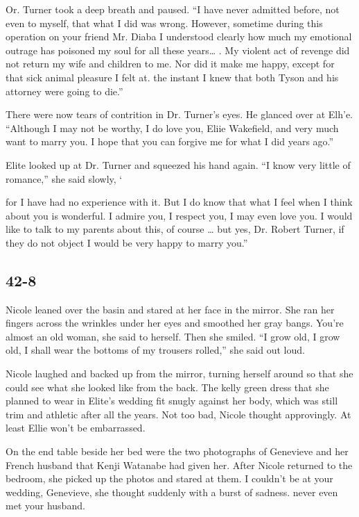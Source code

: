 \documentclass[]{article}
\begin{document}
{Or.  Turner took a deep breath and paused.  “I have never admitted before, not even to myself, that what I did was wrong.  However, sometime during this operation on your friend Mr.  Diaba I understood clearly how much my emotional outrage has poisoned my soul for all these years… .  My violent act of revenge did not return my wife and children to me.  Nor did it make me happy, except for that sick animal pleasure I felt at.  the instant I knew that both Tyson and his attorney were going to die.”

There were now tears of contrition in Dr.  Turner’s eyes.  He glanced over at Elh’e.  “Although I may not be worthy, I do love you, Eliie Wakefield, and very much want to marry you.  I hope that you can forgive me for what I did years ago.”

Elite looked up at Dr.  Turner and squeezed his hand again.  “I know very little of romance,” she said slowly, ‘

for I have had no experience with it.  But I do know that what I feel when I think about you is wonderful.  I admire you, I respect you, I may even love you.  I would like to talk to my parents about this, of course … but yes, Dr.  Robert Turner, if they do not object I would be very happy to marry you.”


\subsection*{42-8}

Nicole leaned over the basin and stared at her face in the mirror.  She ran her fingers across the wrinkles under her eyes and smoothed her gray bangs.  You’re almost an old woman, she said to herself.  Then she smiled.  “I grow old, I grow old, I shall wear the bottoms of my trousers rolled,” she said out loud.

Nicole laughed and backed up from the mirror, turning herself around so that she could see what she looked like from the back.  The kelly green dress that she planned to wear in Elite’s wedding fit snugly against her body, which was still trim and athletic after all the years.  Not too bad, Nicole thought approvingly.  At least Ellie won’t be embarrassed.

On the end table beside her bed were the two photographs of Genevieve and her French husband that Kenji Watanabe had given her.  After Nicole returned to the bedroom, she picked up the photos and stared at them.  I couldn’t be at your wedding, Genevieve, she thought suddenly with a burst of sadness.  never even met your husband.

}
\end{document}
